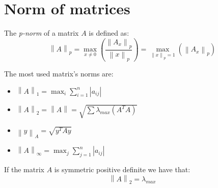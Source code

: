 \section{Norm of matrices}

\begin{definition}
    The \emph{p-norm} of a matrix $A$ is defined as: 
    \[\left\lVert A \right\rVert_p=\max_{x \neq 0}{\left( \dfrac{\left\lVert A_x \right\rVert_p}{\left\lVert x \right\rVert_p} \right)}=
    \max_{\left\lVert x \right\rVert_p=1}{\left( \left\lVert A_x \right\rVert_p \right)}\]
\end{definition}
The most used matrix's norms are: 
\begin{itemize}
    \item $\left\lVert A \right\rVert_1=\max_{i}{\sum_{i=1}^{n}{\left\lvert a_{ij} \right\rvert}}$
    \item $\left\lVert A \right\rVert_2=\left\lVert A \right\rVert=\sqrt{\sum{\lambda_{max}{\left( A^TA \right)}}}$
    \item $\left\lVert y \right\rVert_A=\sqrt{y^TAy}$
    \item $\left\lVert A \right\rVert_{\infty}=\max_{j}{\sum_{j=1}^{n}{\left\lvert a_{ij} \right\rvert}}$
\end{itemize}
\begin{proposition}
    If the matrix $A$ is symmetric positive definite we have that: 
    \[\left\lVert A \right\rVert_2=\lambda_{max}\]
\end{proposition}